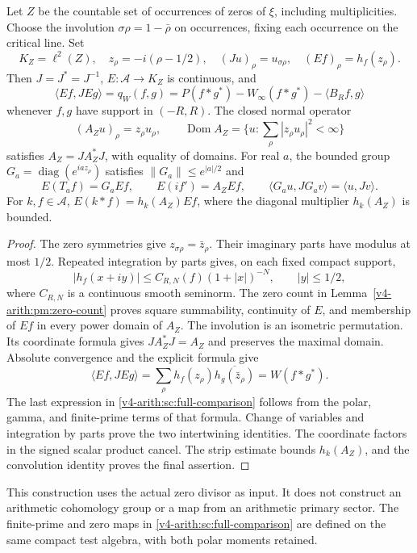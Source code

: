 \begin{theorem}
\label{v4-arith:sc:zero-representation}
Let $Z$ be the countable set of occurrences of zeros of $\xi$,
including multiplicities. Choose the involution
$\sigma\rho=1-\bar\rho$ on occurrences, fixing each occurrence on
the critical line. Set
\[
 K_Z=\ell^2(Z),\quad z_\rho=-i(\rho-1/2),\quad
 (Ju)_\rho=u_{\sigma\rho},\quad (Ef)_\rho=h_f(z_\rho).
\]
Then $J=J^*=J^{-1}$, $E:\mathscr A\to K_Z$ is continuous, and
\begin{equation}
 \langle Ef,JEg\rangle=q_W(f,g)
 =P(f*g^*)-W_\infty(f*g^*)-\langle B_Rf,g\rangle
 \label{v4-arith:sc:full-comparison}
\end{equation}
whenever $f,g$ have support in $(-R,R)$.
The closed normal operator
\[
 (A_Zu)_\rho=z_\rho u_\rho,\qquad
 \operatorname{Dom}A_Z=\{u:\sum_\rho|z_\rho u_\rho|^2<\infty\}
\]
satisfies $A_Z=JA_Z^*J$, with equality of domains.
For real $a$, the bounded group $G_a=\operatorname{diag}(e^{iaz_\rho})$
satisfies $\|G_a\|\le e^{|a|/2}$ and
\[
 E(T_af)=G_aEf,\qquad E(if')=A_ZEf,\qquad
 \langle G_au,JG_av\rangle=\langle u,Jv\rangle.
\]
For $k,f\in\mathscr A$, $E(k*f)=h_k(A_Z)Ef$, where the diagonal
multiplier $h_k(A_Z)$ is bounded.
\end{theorem}
\begin{proof}
The zero symmetries give $z_{\sigma\rho}=\bar z_\rho$.
Their imaginary parts have modulus at most $1/2$.
Repeated integration by parts gives, on each fixed compact support,
\[
 |h_f(x+iy)|\le C_{R,N}(f)(1+|x|)^{-N},\qquad |y|\le1/2,
\]
where $C_{R,N}$ is a continuous smooth seminorm.
The zero count in Lemma~\ref{v4-arith:pm:zero-count} proves square
summability, continuity of $E$, and membership of $Ef$ in every
power domain of $A_Z$.
The involution is an isometric permutation. Its coordinate formula
gives $JA_Z^*J=A_Z$ and preserves the maximal domain.
Absolute convergence and the explicit formula give
\[
 \langle Ef,JEg\rangle
 =\sum_\rho h_f(z_\rho)\overline{h_g(\bar z_\rho)}
 =W(f*g^*).
\]
The last expression in \eqref{v4-arith:sc:full-comparison} follows
from the polar, gamma, and finite-prime terms of that formula.
Change of variables and integration by parts prove the two
intertwining identities. The coordinate factors in the signed
scalar product cancel. The strip estimate bounds $h_k(A_Z)$, and
the convolution identity proves the final assertion.
\end{proof}

This construction uses the actual zero divisor as input. It does not
construct an arithmetic cohomology group or a map from an arithmetic
primary sector. The finite-prime and zero maps in
\eqref{v4-arith:sc:full-comparison} are defined on the same compact
test algebra, with both polar moments retained.

